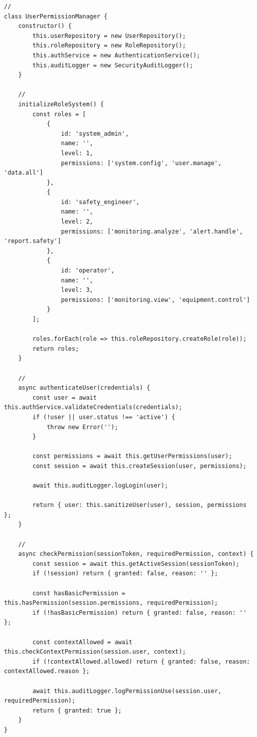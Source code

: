 \begin{verbatim}
// 
class UserPermissionManager {
    constructor() {
        this.userRepository = new UserRepository();
        this.roleRepository = new RoleRepository();
        this.authService = new AuthenticationService();
        this.auditLogger = new SecurityAuditLogger();
    }
    
    // 
    initializeRoleSystem() {
        const roles = [
            {
                id: 'system_admin',
                name: '',
                level: 1,
                permissions: ['system.config', 'user.manage', 'data.all']
            },
            {
                id: 'safety_engineer', 
                name: '',
                level: 2,
                permissions: ['monitoring.analyze', 'alert.handle', 'report.safety']
            },
            {
                id: 'operator',
                name: '',
                level: 3,
                permissions: ['monitoring.view', 'equipment.control']
            }
        ];
        
        roles.forEach(role => this.roleRepository.createRole(role));
        return roles;
    }
    
    // 
    async authenticateUser(credentials) {
        const user = await this.authService.validateCredentials(credentials);
        if (!user || user.status !== 'active') {
            throw new Error('');
        }
        
        const permissions = await this.getUserPermissions(user);
        const session = await this.createSession(user, permissions);
        
        await this.auditLogger.logLogin(user);
        
        return { user: this.sanitizeUser(user), session, permissions };
    }
    
    // 
    async checkPermission(sessionToken, requiredPermission, context) {
        const session = await this.getActiveSession(sessionToken);
        if (!session) return { granted: false, reason: '' };
        
        const hasBasicPermission = this.hasPermission(session.permissions, requiredPermission);
        if (!hasBasicPermission) return { granted: false, reason: '' };
        
        const contextAllowed = await this.checkContextPermission(session.user, context);
        if (!contextAllowed.allowed) return { granted: false, reason: contextAllowed.reason };
        
        await this.auditLogger.logPermissionUse(session.user, requiredPermission);
        return { granted: true };
    }
}
\end{verbatim}

